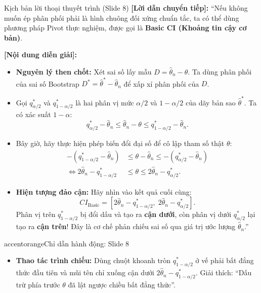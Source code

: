\documentclass[10pt,a4paper]{article}
\begin{document}
\begin{scriptbox}{Kịch bản lời thoại thuyết trình (Slide 8)}
    \textbf{[Lời dẫn chuyển tiếp]:} ``Nếu không muốn ép phân phối phải là hình chuông đối xứng chuẩn tắc, ta có thể dùng phương pháp Pivot thực nghiệm, được gọi là \textbf{Basic CI (Khoảng tin cậy cơ bản)}.
    
    \textbf{[Nội dung diễn giải]:} 
    \begin{itemize}
        \item \textbf{Nguyên lý then chốt:} Xét sai số lấy mẫu $D = \hat\theta_n - \theta$. Ta dùng phân phối của sai số Bootstrap $D^* = \hat\theta^* - \hat\theta_n$ để xấp xỉ phân phối của $D$.
        \item Gọi $q_{\alpha/2}^*$ và $q_{1-\alpha/2}^*$ là hai phân vị mức $\alpha/2$ và $1-\alpha/2$ của dãy bản sao $\hat\theta^*$. Ta có xác suất $1-\alpha$:
        \[
        q_{\alpha/2}^* - \hat\theta_n \le \hat\theta_n - \theta \le q_{1-\alpha/2}^* - \hat\theta_n.
        \]
        \item Bây giờ, hãy thực hiện phép biến đổi đại số để cô lập tham số thật $\theta$:
        \begin{align*}
        -\left(q_{1-\alpha/2}^* - \hat\theta_n\right) &\le \theta - \hat\theta_n \le -\left(q_{\alpha/2}^* - \hat\theta_n\right)\\
        \iff 2\hat\theta_n - q_{1-\alpha/2}^* &\le \theta \le 2\hat\theta_n - q_{\alpha/2}^*.
        \end{align*}
        \item \textbf{Hiện tượng đảo cận:} Hãy nhìn vào kết quả cuối cùng:
        \[
        CI_{\text{Basic}} = \left[2\hat\theta_n - q_{1-\alpha/2}^*,\; 2\hat\theta_n - q_{\alpha/2}^*\right].
        \]
        Phân vị trên $q_{1-\alpha/2}^*$ bị đổi dấu và tạo ra \textbf{cận dưới}, còn phân vị dưới $q_{\alpha/2}^*$ lại tạo ra \textbf{cận trên}! Đây là cơ chế phản chiếu sai số qua giá trị ước lượng $\hat\theta_n$.''
    \end{itemize}
\end{scriptbox}

\begin{actionbox}{accentorange}{Chỉ dẫn hành động: Slide 8}
    \begin{itemize}
        \item \textbf{Thao tác trình chiếu:} Dùng chuột khoanh tròn $q_{1-\alpha/2}^*$ ở vế phải bất đẳng thức đầu tiên và mũi tên chỉ xuống cận dưới $2\hat\theta_n - q_{1-\alpha/2}^*$. Giải thích: ``Dấu trừ phía trước $\theta$ đã lật ngược chiều bất đẳng thức''.
    \end{itemize}
\end{actionbox}
\end{document}
